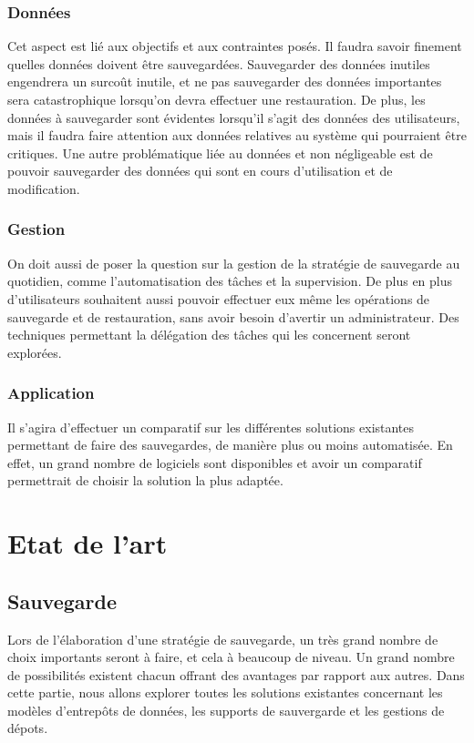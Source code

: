 \documentclass[a4paper,11pt]{report}
\begin{document}
\subsection{Données}
Cet aspect est lié aux objectifs et aux contraintes posés.
Il faudra savoir finement quelles données doivent être sauvegardées.
Sauvegarder des données inutiles engendrera un surcoût inutile, et ne pas sauvegarder des données importantes sera catastrophique lorsqu'on devra effectuer une restauration.
De plus, les données à sauvegarder sont évidentes lorsqu'il s'agit des données des utilisateurs, mais il faudra faire attention aux données relatives au système qui pourraient être critiques.
Une autre problématique liée au données et non négligeable est de pouvoir sauvegarder des données qui sont en cours d'utilisation et de modification. 

\subsection{Gestion}
On doit aussi de poser la question sur la gestion de la stratégie de sauvegarde au quotidien, comme l'automatisation des tâches et la supervision.
De plus en plus d'utilisateurs souhaitent aussi pouvoir effectuer eux même les opérations de sauvegarde et de restauration, sans avoir besoin d'avertir un administrateur.
Des techniques permettant la délégation des tâches qui les concernent seront explorées.

\subsection{Application}
Il s'agira d'effectuer un comparatif sur les différentes solutions existantes permettant de faire des sauvegardes, de manière plus ou moins automatisée.
En effet, un grand nombre de logiciels sont disponibles et avoir un comparatif permettrait de choisir la solution la plus adaptée.

\chapter{Etat de l'art}

\section{Sauvegarde}

Lors de l'élaboration d'une stratégie de sauvegarde, un très grand nombre de choix importants seront à faire, et cela à beaucoup de niveau.
Un grand nombre de possibilités existent chacun offrant des avantages par rapport aux autres.
Dans cette partie, nous allons explorer toutes les solutions existantes concernant les modèles d'entrepôts de données, les supports de sauvergarde et les gestions de dépots.
\end{document}
